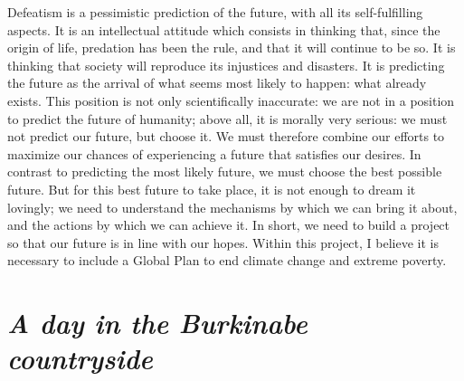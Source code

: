 \documentclass[a5paper,english,openany]{memoir}
\begin{document}
Defeatism %
is a pessimistic prediction of the future, with all its self-fulfilling aspects. It is an intellectual attitude which consists in thinking that, since the origin of life, predation has been the rule, and that it will continue to be so. It is thinking %
that society will reproduce its injustices and disasters. It is predicting the future as the arrival of what seems most likely to happen: what already exists. This position is not only scientifically inaccurate: we are not in a position to predict the future of humanity; above all, it is morally very serious: %
we must not predict our future, but choose it. %
We must therefore combine our efforts to maximize our chances of experiencing a future that satisfies our desires. In contrast to predicting the most likely future, we must choose the best possible future. But for this best future to take place, it is not enough to dream it lovingly; we need to understand the mechanisms by which we can bring it about, and the actions by which we can achieve it. In short, we need to build a project so that our future is in line with our hopes.
Within this project, I believe it is necessary to include a Global Plan to end climate change and extreme poverty. %

\chapter*{\textit{A day in the Burkinabe countryside}}\label{ch:narr_burkina}
\end{document}
